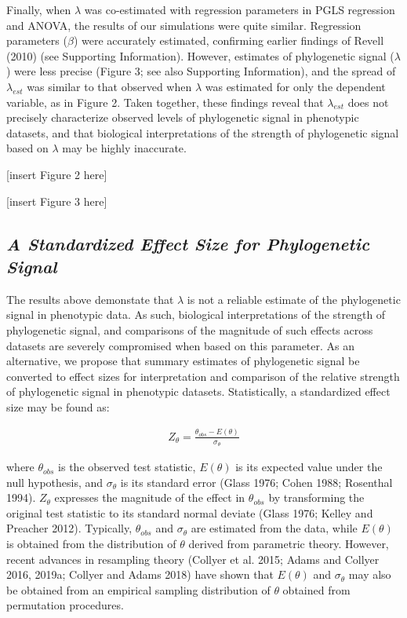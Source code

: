 \documentclass[]{article}
\begin{document}
Finally, when \(\lambda\) was co-estimated with regression parameters in
PGLS regression and ANOVA, the results of our simulations were quite
similar. Regression parameters (\(\beta\)) were accurately estimated,
confirming earlier findings of Revell (2010) (see Supporting
Information). However, estimates of phylogenetic signal (\(\lambda\))
were less precise (Figure 3; see also Supporting Information), and the
spread of \(\lambda_{est}\) was similar to that observed when
\(\lambda\) was estimated for only the dependent variable, as in Figure
2. Taken together, these findings reveal that \(\lambda_{est}\) does not
precisely characterize observed levels of phylogenetic signal in
phenotypic datasets, and that biological interpretations of the strength
of phylogenetic signal based on \(\lambda\) may be highly inaccurate.
\hfill\break

{[}insert Figure 2 here{]} \hfill\break

{[}insert Figure 3 here{]} \hfill\break 

\hypertarget{a-standardized-effect-size-for-phylogenetic-signal}{%
\subsection{\texorpdfstring{\emph{A Standardized Effect Size for
Phylogenetic
Signal}}{A Standardized Effect Size for Phylogenetic Signal}}\label{a-standardized-effect-size-for-phylogenetic-signal}}

The results above demonstate that \(\lambda\) is not a reliable estimate
of the phylogenetic signal in phenotypic data. As such, biological
interpretations of the strength of phylogenetic signal, and comparisons
of the magnitude of such effects across datasets are severely
compromised when based on this parameter. As an alternative, we propose
that summary estimates of phylogenetic signal be converted to effect
sizes for interpretation and comparison of the relative strength of
phylogenetic signal in phenotypic datasets. Statistically, a
standardized effect size may be found as:

\begin{align}
    Z_{\theta}=\frac{\theta_{obs}-E(\theta)}{\sigma_\theta}
\end{align}

where \(\theta_{obs}\) is the observed test statistic, \(E(\theta)\) is
its expected value under the null hypothesis, and \(\sigma_\theta\) is
its standard error (Glass 1976; Cohen 1988; Rosenthal 1994).
\(Z_{\theta}\) expresses the magnitude of the effect in \(\theta_{obs}\)
by transforming the original test statistic to its standard normal
deviate (Glass 1976; Kelley and Preacher 2012). Typically,
\(\theta_{obs}\) and \(\sigma_\theta\) are estimated from the data,
while \(E(\theta)\) is obtained from the distribution of \(\theta\)
derived from parametric theory. However, recent advances in resampling
theory (Collyer et al. 2015; Adams and Collyer 2016, 2019a; Collyer and
Adams 2018) have shown that \(E(\theta)\) and \(\sigma_\theta\) may also
be obtained from an empirical sampling distribution of \(\theta\)
obtained from permutation procedures. \hfill\break
\end{document}
